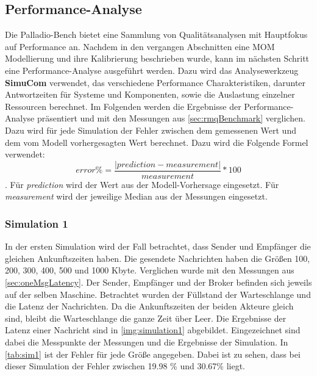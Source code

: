 \subsection{Performance-Analyse}
\label{sec:performanceanalyse}
Die Palladio-Bench bietet eine Sammlung von Qualitätsanalysen mit Hauptfokus auf Performance an. Nachdem in den vergangen Abschnitten eine MOM Modellierung und ihre Kalibrierung beschrieben wurde, kann im nächsten Schritt eine Performance-Analyse ausgeführt werden. Dazu wird das Analysewerkzeug \textbf{SimuCom} verwendet, das verschiedene Performance Charakteristiken, darunter Antwortzeiten für Systeme und Komponenten, sowie die Auslastung einzelner Ressourcen berechnet. Im Folgenden werden die Ergebnisse der Performance-Analyse präsentiert und mit den Messungen aus \autoref{sec:rmqBenchmark} verglichen. Dazu wird für jede Simulation der Fehler zwischen dem gemessenen Wert und dem vom Modell vorhergesagten Wert berechnet. Dazu wird die Folgende Formel verwendet: \[ error\% = \frac{|prediction - measurement|}{measurement} * 100 \]. Für \textit{prediction} wird der Wert aus der Modell-Vorhersage eingesetzt. Für \textit{measurement} wird der jeweilige Median aus der Messungen eingesetzt.
\subsubsection{Simulation 1} 
\label{sec:rmqSimulation1}
In der ersten Simulation wird der Fall betrachtet, dass Sender und Empfänger die gleichen Ankunftszeiten haben. Die gesendete Nachrichten haben die Größen 100, 200, 300, 400, 500 und 1000 Kbyte. Verglichen wurde mit den Messungen aus \autoref{sec:oneMsgLatency}. Der Sender, Empfänger und der Broker befinden sich jeweils auf der selben Maschine. Betrachtet wurden der Füllstand der Warteschlange und die Latenz der Nachrichten. 
Da die Ankunftszeiten der beiden Akteure gleich sind, bleibt die Warteschlange die ganze Zeit über Leer. Die Ergebnisse der Latenz einer Nachricht sind in \autoref{img:simulation1} abgebildet. Eingezeichnet sind dabei die Messpunkte der Messungen und die Ergebnisse der Simulation. In \autoref{tab:sim1} ist der Fehler für jede Größe angegeben. Dabei ist zu sehen, dass bei dieser Simulation der Fehler zwischen 19.98 \% und 30.67\% liegt.

